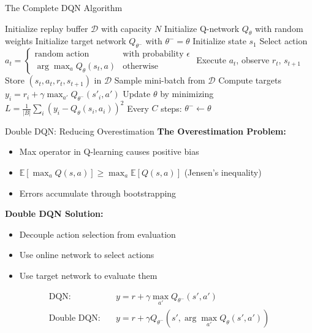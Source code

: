 \documentclass[aspectratio=169,10pt]{beamer}
\begin{document}
\begin{frame}{The Complete DQN Algorithm}
\begin{algorithmic}[1]
\STATE Initialize replay buffer $\mathcal{D}$ with capacity $N$
\STATE Initialize Q-network $Q_\theta$ with random weights
\STATE Initialize target network $Q_{\theta^-}$ with $\theta^- = \theta$
    \STATE Initialize state $s_1$
        \STATE Select action $a_t = \begin{cases}
            \text{random action} & \text{with probability } \epsilon \\
            \arg\max_a Q_\theta(s_t, a) & \text{otherwise}
        \end{cases}$
        \STATE Execute $a_t$, observe $r_t$, $s_{t+1}$
        \STATE Store $(s_t, a_t, r_t, s_{t+1})$ in $\mathcal{D}$
        \STATE Sample mini-batch from $\mathcal{D}$
        \STATE Compute targets $y_i = r_i + \gamma \max_{a'} Q_{\theta^-}(s'_i, a')$
        \STATE Update $\theta$ by minimizing $L = \frac{1}{|B|}\sum_i (y_i - Q_\theta(s_i, a_i))^2$
        \STATE Every $C$ steps: $\theta^- \leftarrow \theta$
    \ENDFOR
\ENDFOR
\end{algorithmic}

\end{frame}
\begin{frame}{Double DQN: Reducing Overestimation}
\textbf{The Overestimation Problem:}
\begin{itemize}
    \item Max operator in Q-learning causes positive bias
    \item $\mathbb{E}[\max_a Q(s,a)] \geq \max_a \mathbb{E}[Q(s,a)]$ (Jensen's inequality)
    \item Errors accumulate through bootstrapping
\end{itemize}

\vspace{0.3cm}
\textbf{Double DQN Solution:}
\begin{itemize}
    \item Decouple action selection from evaluation
    \item Use online network to select actions
    \item Use target network to evaluate them
\end{itemize}

\begin{align}
\text{DQN:} & \quad y = r + \gamma \max_{a'} Q_{\theta^-}(s', a') \\
\text{Double DQN:} & \quad y = r + \gamma Q_{\theta^-}(s', \arg\max_{a'} Q_\theta(s', a'))
\end{align}

\end{frame}
\end{document}
